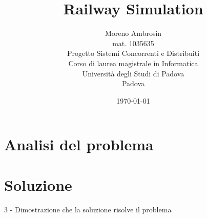 \documentclass[12pt,a4paper]{report}
\title{\Huge Railway Simulation}
\author	{
	\Large Moreno Ambrosin\\
	\Large mat. 1035635\\
	[1.5cm]
	\Large Progetto Sistemi Concorrenti e Distribuiti\\
	[3cm]
	\large Corso di laurea magistrale in Informatica \\
	\large Università degli Studi di Padova\\
	\large Padova\\
	[1.5cm]
		}
\date{\today}
\begin{document}
	\maketitle
	\tableofcontents
	
	\chapter{Analisi del problema}
	\chapter{Soluzione}

3 - Dimostrazione che la soluzione risolve il problema
   
\end{document}
